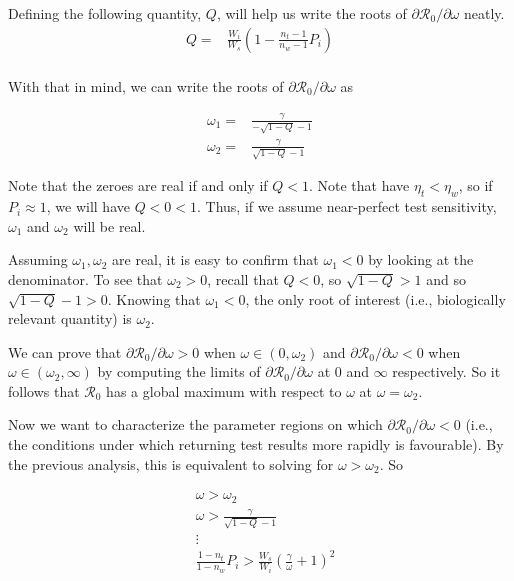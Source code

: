 \documentclass{article}
\newcommand{\Rnum}{\mathcal{R}_0}
\theoremstyle{definition} %
\begin{document}
Defining the following quantity, $Q$, will help us write the roots of $\partial{\Rnum}/\partial{\omega}$ neatly. 
\begin{align}\label{eq:defQ}
    Q =& \frac{W_i}{W_s}\left(1-\frac{n_{t}-1}{n_{w}-1}P_{i}\right) \\
\end{align}

With that in mind, we can write the roots of $\partial{\Rnum}/\partial{\omega}$ as

\begin{align}
    \omega_1 =& \frac{\gamma}{-\sqrt{1-Q}-1} \\
    \omega_2 =& \frac{\gamma}{\sqrt{1-Q}-1}
\end{align}

Note that the zeroes are real if and only if $Q < 1$. Note that have $\eta_t < \eta_w$, so if $P_i \approx 1$, we will have $Q < 0 < 1$. Thus, if we assume near-perfect test sensitivity, $\omega_1$ and $\omega_2$ will be real. 

Assuming $\omega_1, \omega_2$ are real, it is easy to confirm that $\omega_1 < 0$ by looking at the denominator. To see that $\omega_2 > 0$, recall that $Q < 0$, so $\sqrt{1-Q} > 1$ and so $\sqrt{1-Q} -1 > 0$. Knowing that $\omega_1 < 0$, the only root of interest (i.e., biologically relevant quantity) is $\omega_2$. 

We can prove that $\partial{\Rnum}/\partial{\omega} > 0$ when $\omega \in (0,\omega_2)$ and $\partial{\Rnum}/\partial{\omega} < 0$ when $\omega \in (\omega_2,\infty)$ by computing the limits of $\partial{\Rnum}/\partial{\omega}$ at $0$ and $\infty$ respectively. So it follows that $\Rnum$ has a global maximum with respect to $\omega$ at $\omega = \omega_2$.

Now we want to characterize the parameter regions on which $\partial{\Rnum}/\partial{\omega} < 0$ (i.e., the conditions under which returning test results more rapidly is favourable). By the previous analysis, this is equivalent to solving for $\omega > \omega_2$. So

\begin{align}\label{eq:necsuf}
    &\omega > \omega_2 \nonumber \\
    &\omega > \frac{\gamma}{\sqrt{1-Q}-1} \nonumber \\
    &\vdots \nonumber \\
    &\frac{1-n_{t}}{1-n_{w}}P_{i}>\frac{W_{s}}{W_{i}}\left(\frac{\gamma}{\omega}+1\right)^{2}
\end{align}
\end{document}
